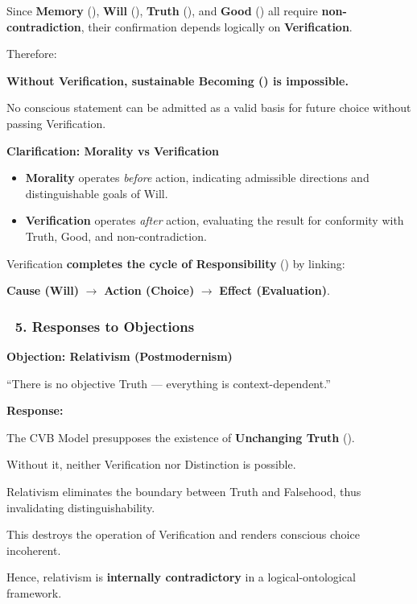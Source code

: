 \documentclass[12pt]{article}
\begin{document}
Since \textbf{Memory} (\text{[10.3]}), \textbf{Will} (\text{[10.6]}), \textbf{Truth} (\text{[11.2]}), and \textbf{Good} (\text{[11.3]}) all require \textbf{non-contradiction}, their confirmation depends logically on \textbf{Verification}.

Therefore:

\textbf{Without Verification, sustainable Becoming (\text{[7]}) is impossible.}

No conscious statement can be admitted as a valid basis for future choice without passing Verification.

\textbf{Clarification: Morality vs Verification}

\begin{itemize}
\item \textbf{Morality} operates \emph{before} action, indicating admissible directions and distinguishable goals of Will.
\item \textbf{Verification} operates \emph{after} action, evaluating the result for conformity with Truth, Good, and non-contradiction.
\end{itemize}

Verification \textbf{completes the cycle of Responsibility} (\text{[11.5]}) by linking:

\textbf{Cause (Will)} $\rightarrow$ \textbf{Action (Choice)} $\rightarrow$ \textbf{Effect (Evaluation)}.

\subsubsection*{🔹 5. Responses to Objections}

\textbf{Objection: Relativism (Postmodernism)}

``There is no objective Truth — everything is context-dependent.''

\textbf{Response:}

The CVB Model presupposes the existence of \textbf{Unchanging Truth} (\text{[11.2.1]}).

Without it, neither Verification nor Distinction is possible.

Relativism eliminates the boundary between Truth and Falsehood, thus invalidating distinguishability.

This destroys the operation of Verification and renders conscious choice incoherent.

Hence, relativism is \textbf{internally contradictory} in a logical-ontological framework.

\bigskip
\end{document}

